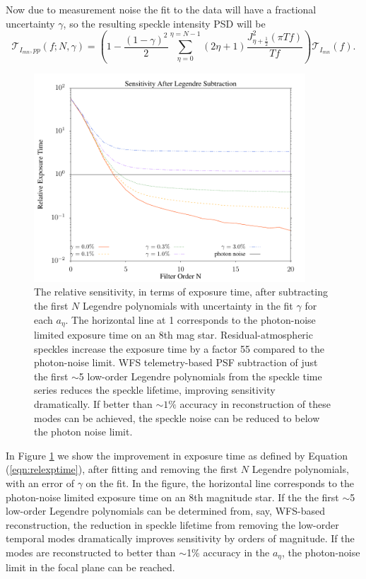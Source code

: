 \documentclass[10pt,preprint]{aastex631}
\begin{document}
Now due to measurement noise the fit to the data will have a fractional uncertainty $\gamma$, so the resulting speckle intensity PSD will be
\begin{equation}
\mathcal{T}_{I_{mn},pp}(f;N,\gamma) = \left( 1 -  \frac{(1-\gamma)^2}{2}\sum_{\eta=0}^{\eta=N-1}  (2\eta+1) \frac{J_{\eta+\frac{1}{2}}^2(\pi T f)}{T f}\right) \mathcal{T}_{I_{mn}}(f).
\end{equation}

\begin{figure}
\centering
\includegraphics[width=4in]{relsens.pdf}
\caption{The relative sensitivity, in terms of exposure time, after subtracting the first $N$ Legendre polynomials with uncertainty in the fit $\gamma$ for each $a_\eta$.  The horizontal line at 1 corresponds to the photon-noise limited exposure time on an 8th mag star.  Residual-atmospheric speckles increase the exposure time by a factor 55 compared to the photon-noise limit.   
WFS telemetry-based PSF subtraction of just the first $\sim$5 low-order Legendre polynomials from the speckle time series reduces the speckle lifetime, improving sensitivity dramatically. If better than $\sim$$1\%$ accuracy in reconstruction of these modes can be achieved, the speckle noise can be reduced to below the photon noise limit. \label{fig:legrelsens}}
\end{figure}

In Figure \ref{fig:legrelsens} we show the improvement in exposure time as defined by Equation (\ref{eqn:relexptime}), after fitting and removing the first $N$ Legendre polynomials, with an error of $\gamma$ on the fit.  In the figure, the horizontal line corresponds to the photon-noise limited exposure time on an 8th magnitude star.  If the the first $\sim$5 low-order Legendre polynomials can be determined from, say, WFS-based reconstruction, the reduction in speckle lifetime from removing the low-order temporal modes dramatically improves sensitivity by orders of magnitude.  If the modes are reconstructed to better than $\sim$1\% accuracy in the $a_\eta$, the photon-noise limit in the focal plane can be reached.
\end{document}
